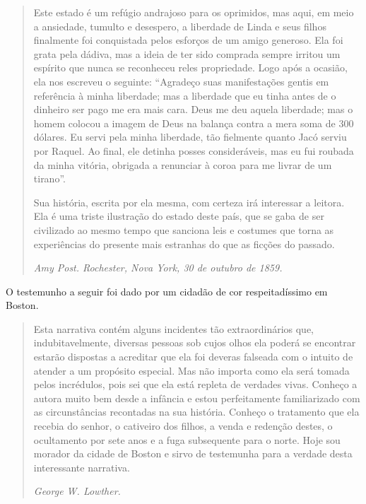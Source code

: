 \begin{quote}
Este estado é um refúgio andrajoso para
os oprimidos, mas aqui, em meio a ansiedade, tumulto e desespero, a
liberdade de Linda e seus filhos finalmente foi conquistada pelos
esforços de um amigo generoso. Ela foi grata pela dádiva, mas a ideia de
ter sido comprada sempre irritou um espírito que nunca se
reconheceu reles propriedade. Logo após a ocasião, ela nos escreveu o
seguinte: ``Agradeço suas manifestações gentis em referência à minha
liberdade; mas a liberdade que eu tinha antes de o dinheiro ser pago me
era mais cara. Deus me deu aquela liberdade; mas o homem colocou a
imagem de Deus na balança contra a mera soma de 300 dólares. Eu servi
pela minha liberdade, tão fielmente quanto Jacó serviu por Raquel. Ao
final, ele detinha posses consideráveis, mas eu fui roubada da minha
vitória, obrigada a renunciar à coroa para me livrar de um tirano''.

Sua história, escrita por ela mesma,
com certeza irá interessar a leitora. Ela é uma triste ilustração do
estado deste país, que se gaba de ser civilizado ao mesmo tempo que
sanciona leis e costumes que torna as experiências do presente mais
estranhas do que as ficções do passado.

\emph{Amy Post. Rochester, Nova York, 30 de
outubro de 1859.}
\end{quote}

O testemunho a seguir foi dado por um
cidadão de cor respeitadíssimo em Boston.

\begin{quote}
Esta narrativa contém alguns incidentes
tão extraordinários que, indubitavelmente, diversas pessoas sob cujos
olhos ela poderá se encontrar estarão dispostas a acreditar que ela foi
deveras falseada com o intuito de atender a um propósito especial. Mas
não importa como ela será tomada pelos incrédulos, pois sei que ela está
repleta de verdades vivas. Conheço a autora muito bem desde a infância e
estou perfeitamente familiarizado com as circunstâncias recontadas na
sua história. Conheço o tratamento que ela recebia do senhor, o
cativeiro dos filhos, a venda e redenção destes, o ocultamento por sete
anos e a fuga subsequente para o norte. Hoje sou morador da cidade de
Boston e sirvo de testemunha para a verdade desta interessante
narrativa.

\emph{George W. Lowther.}
\end{quote}
